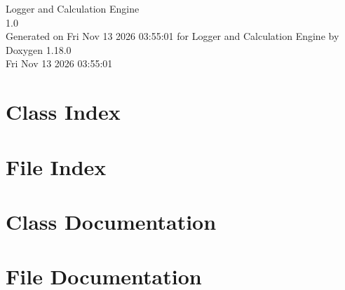 \documentclass[twoside]{book}
\newcommand{\+}{\discretionary{\mbox{\scriptsize$\hookleftarrow$}}{}{}}
\newcommand{\clearemptydoublepage}{%
    \newpage{\pagestyle{empty}\cleardoublepage}%
  }
\begin{document}
  \raggedbottom
    \hypersetup{pageanchor=false,
                bookmarksnumbered=true,
                pdfencoding=unicode
               }
  \begin{titlepage}
  \vspace*{7cm}
  \begin{center}%
  {\Large Logger and Calculation Engine}\\
  [1ex]\large 1.\+0 \\
  \vspace*{1cm}
  {\large Generated on Fri Nov 13 2026 03:\+55:\+01 for Logger and Calculation Engine by Doxygen 1.18.0}\\
    \vspace*{0.5cm}
    {\small Fri Nov 13 2026 03:55:01}
  \end{center}
  \end{titlepage}
  \clearemptydoublepage
  \tableofcontents
  \clearemptydoublepage
  \hypersetup{pageanchor=true}


\chapter{Class Index}

\chapter{File Index}

\chapter{Class Documentation}


\chapter{File Documentation}





  \backmatter
  \newpage
  \clearemptydoublepage
  \printindex
\end{document}
